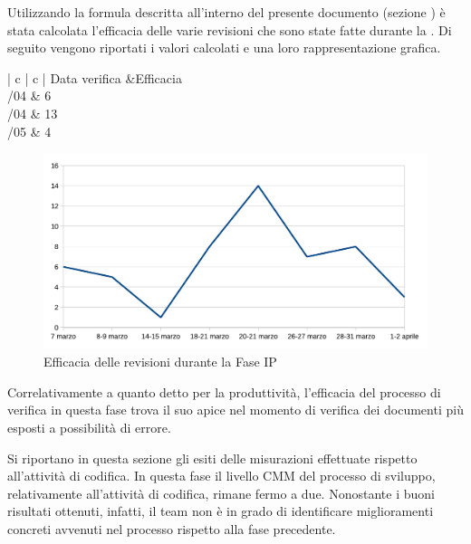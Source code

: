 	Utilizzando la formula descritta all'interno del presente documento (sezione ) è stata calcolata l'efficacia delle varie revisioni che sono state fatte durante la . Di seguito vengono riportati i valori calcolati e una loro rappresentazione grafica.
	\begin{table}[H]
		\centering
		\begin{tabu}{| c | c |}
		\hline
		Data verifica &Efficacia\\ \hline {}/04 & 6 \\ /04 & 13\\ /05 & 4 \\ \hline		
		\end{tabu}
		\caption{Efficacia delle revisioni durante la fase IP}
	\end{table}
	\begin{figure}[H]
		\centering
		\includegraphics[width=12cm]{PianoDiQualifica/Pics/EfficaciaRevisioniFaseSD.pdf}
		\caption{Efficacia delle revisioni durante la Fase IP}
	\end{figure}

	Correlativamente a quanto detto per la produttività, l'efficacia del processo di verifica in questa fase trova il suo apice nel momento di verifica dei documenti più esposti a possibilità di errore.
	
		Si riportano in questa sezione gli esiti delle misurazioni effettuate rispetto all'attività di codifica.
		In questa fase il livello CMM del processo di sviluppo, relativamente all'attività di codifica, rimane fermo a due. Nonostante i buoni risultati ottenuti, infatti, il team non è in grado di identificare miglioramenti concreti avvenuti nel processo rispetto alla fase precedente.
		

